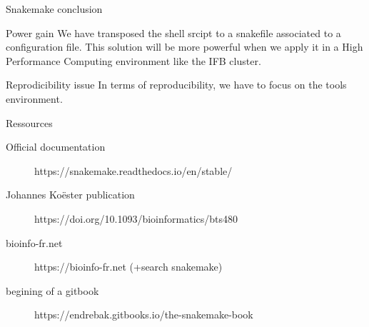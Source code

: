 \begin{frame}{Snakemake conclusion}
\begin{block}{Power gain}
We have transposed the shell srcipt to a snakefile associated to a configuration file. This solution will be more powerful when we apply it in a High Performance Computing environment like the IFB cluster.
\end{block}
\begin{block}{Reprodicibility issue}
In terms of reproducibility, we have to focus on the tools environment.
\end{block}
\end{frame}
\begin{frame}{Ressources}
\begin{description}
    \item [Official documentation] https://snakemake.readthedocs.io/en/stable/
    \item [Johannes Koëster publication] https://doi.org/10.1093/bioinformatics/bts480
    \item [bioinfo-fr.net]  https://bioinfo-fr.net (+search snakemake)
    \item [begining of a gitbook] https://endrebak.gitbooks.io/the-snakemake-book
\end{description}
    
\end{frame}
